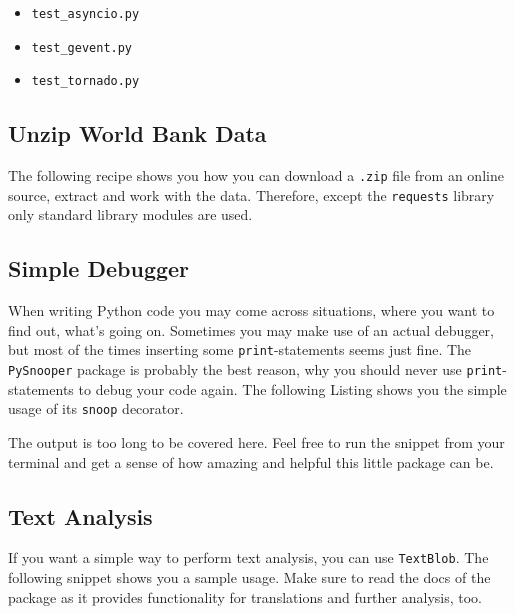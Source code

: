 \begin{itemize}
    \item \lstinline{test_asyncio.py}
    \item \lstinline{test_gevent.py}
    \item \lstinline{test_tornado.py}
\end{itemize}


\subsection{Unzip World Bank Data}

The following recipe shows you how you can download a \lstinline{.zip} file from an online source, extract and work with the data.
Therefore, except the \lstinline{requests} library only standard library modules are used.




\subsection{Simple Debugger}

When writing Python code you may come across situations, where you want to find out, what's going on.
Sometimes you may make use of an actual debugger, but most of the times inserting some \lstinline{print}-statements seems just fine.
The \lstinline{PySnooper} package is probably the best reason, why you should never use \lstinline{print}-statements to debug your code again.
The following Listing shows you the simple usage of its \lstinline{snoop} decorator.



The output is too long to be covered here.
Feel free to run the snippet from your terminal and get a sense of how amazing and helpful this little package can be.


\subsection{Text Analysis}

If you want a simple way to perform text analysis, you can use \lstinline{TextBlob}.
The following snippet shows you a sample usage.
Make sure to read the docs of the package as it provides functionality for translations and further analysis, too.



